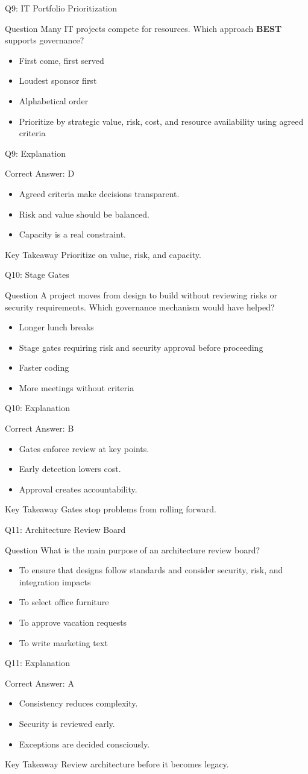 \documentclass[aspectratio=169]{beamer}
\newcommand{\hq}[7]{%
	\begin{frame}{Q#1: #2}
		\begin{block}{Question}
			#3
		\end{block}
		\begin{itemize}
			#4
		\end{itemize}
	\end{frame}
	\begin{frame}{Q#1: Explanation}
		\begin{block}{Correct Answer: #5}
			\begin{itemize}
				#6
			\end{itemize}
		\end{block}
		\begin{alertblock}{Key Takeaway}
			#7
		\end{alertblock}
	\end{frame}
}
\begin{document}
	\hq{9}{IT Portfolio Prioritization}
	{Many IT projects compete for resources. Which approach \textbf{BEST} supports governance?}
	{\item[\textbf{(A)}] First come, first served
		\item[\textbf{(B)}] Loudest sponsor first
		\item[\textbf{(C)}] Alphabetical order
		\item[\textbf{(D)}] Prioritize by strategic value, risk, cost, and resource availability using agreed criteria}
	{D}
	{\item Agreed criteria make decisions transparent.
		\item Risk and value should be balanced.
		\item Capacity is a real constraint.}
	{Prioritize on value, risk, and capacity.}

	\hq{10}{Stage Gates}
	{A project moves from design to build without reviewing risks or security requirements. Which governance mechanism would have helped?}
	{\item[\textbf{(A)}] Longer lunch breaks
		\item[\textbf{(B)}] Stage gates requiring risk and security approval before proceeding
		\item[\textbf{(C)}] Faster coding
		\item[\textbf{(D)}] More meetings without criteria}
	{B}
	{\item Gates enforce review at key points.
		\item Early detection lowers cost.
		\item Approval creates accountability.}
	{Gates stop problems from rolling forward.}

	\hq{11}{Architecture Review Board}
	{What is the main purpose of an architecture review board?}
	{\item[\textbf{(A)}] To ensure that designs follow standards and consider security, risk, and integration impacts
		\item[\textbf{(B)}] To select office furniture
		\item[\textbf{(C)}] To approve vacation requests
		\item[\textbf{(D)}] To write marketing text}
	{A}
	{\item Consistency reduces complexity.
		\item Security is reviewed early.
		\item Exceptions are decided consciously.}
	{Review architecture before it becomes legacy.}
\end{document}
